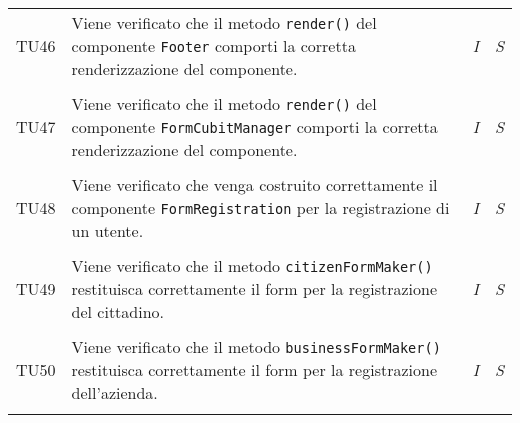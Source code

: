 \begin{longtable}{ >{\centering}p{} >{}p{}
				>{\centering}p{} >{\centering}p{}}
			\tabularnewline
			\hypertarget{TU46}{TU46} & Viene verificato che il metodo 
			\texttt{render()} del componente \texttt{Footer} comporti la 
			corretta renderizzazione del componente. & 
			\textit{I} & 
			\textit{S}\\
			
			\tabularnewline
			\hypertarget{TU47}{TU47} & Viene verificato che il metodo 
			\texttt{render()} del componente \texttt{FormCubitManager} comporti 
			la corretta renderizzazione del componente. & 
			\textit{I} & 
			\textit{S}\\
			
			\tabularnewline
			\hypertarget{TU48}{TU48} & Viene verificato che venga costruito 
			correttamente il componente \texttt{FormRegistration} per la 
			registrazione di un utente. & 
			\textit{I} & 
			\textit{S}\\ 
			
			\tabularnewline
			\hypertarget{TU49}{TU49} & Viene verificato che il metodo 
			\texttt{citizenFormMaker()} restituisca correttamente il form per 
			la registrazione del cittadino. & 
			\textit{I} & 
			\textit{S}\\
			
			\tabularnewline
			\hypertarget{TU50}{TU50} & Viene verificato che il metodo 
			\texttt{businessFormMaker()} restituisca correttamente il form per  
			la registrazione dell'azienda. & 
			\textit{I} & 
			\textit{S}\\        
			     
			
			\tabularnewline
		\end{longtable}

		\renewcommand{\arraystretch}{1.5}
		
